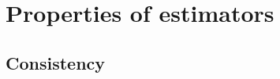 

\section{Properties of estimators}
\label{sec:point_estimation_prop_of_estimator}

\subsection{Consistency}
\label{subsec:prop_of_estimator_consistency}

